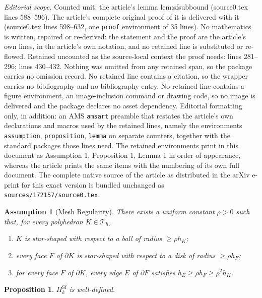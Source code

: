 \documentclass[10pt,a4paper]{amsart}
\newtheorem{assumption}{Assumption}
\newtheorem{proposition}{Proposition}
\newcommand{\bfitgreek}[1]{\bm{\mathit{#1}}}
\begin{document}
\noindent\textit{Editorial scope.} Counted unit: the article's lemma lem:sfsubbound (source0.tex lines 588--596). The article's complete original proof of it is delivered with it (source0.tex lines 598--632, one \texttt{proof} environment of 35 lines). No mathematics is written, repaired or re-derived: the statement and the proof are the article's own lines, in the article's own notation, and no retained line is substituted or re-flowed.  Retained uncounted as the source-local context the proof needs: lines 281--296; lines 430--432.  Nothing was omitted from any retained span, so the package carries no omission record.  No retained line contains a citation, so the wrapper carries no bibliography and no bibliography entry.  No retained line contains a figure environment, an image-inclusion command or drawing code, so no image is delivered and the package declares no asset dependency.  Editorial formatting only, in addition: an AMS \texttt{amsart} preamble that restates the article's own declarations and macros used by the retained lines, namely the environments \texttt{assumption}, \texttt{proposition}, \texttt{lemma} on separate counters, together with the standard packages those lines need.  The retained environments print in this document as Assumption 1, Proposition 1, Lemma 1 in order of appearance, whereas the article prints the same items with the numbering of its own full document.  The complete native source of the article as distributed in the arXiv e-print for this exact version is bundled unchanged as \texttt{sources/172157/source0.tex}.
\begin{assumption}[Mesh Regularity]
  \label{ass:mesh}There exists a uniform constant \(\rho>0\) such that, for every
  polyhedron \(K\in \mathcal{T}_{h}\),
  \begin{enumerate}
    \def\labelenumi{(\roman{enumi})}
    \item
          \(K\) is star-shaped with respect to a ball of radius
          \(\geq \rho h_K\);
    \item
          every face \(F\) of \(\partial K\) is star-shaped with respect to a
          disk of radius \(\geq \rho h_F\);
    \item
          for every face \(F\) of \(\partial K\), every edge \(E\) of
          \(\partial F\) satisfies \( h_E \geq \rho h_F \geq \rho^2 h_K\).
  \end{enumerate}
\end{assumption}

\begin{proposition}
  \label{prop:sf}\(\bfitgreek{\Pi}^{\mathrm{Sf}}_{k}\) is well-defined.
\end{proposition}
\end{document}
